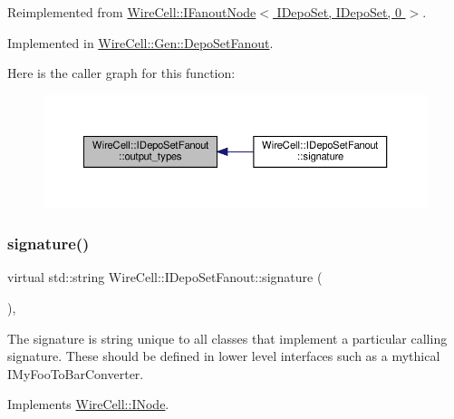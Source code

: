 Reimplemented from \hyperlink{class_wire_cell_1_1_i_fanout_node_a2191dc9d44b35d6ff4bda5d5356c6ac5}{Wire\+Cell\+::\+I\+Fanout\+Node$<$ I\+Depo\+Set, I\+Depo\+Set, 0 $>$}.



Implemented in \hyperlink{class_wire_cell_1_1_gen_1_1_depo_set_fanout_a11637470dcf8dc0ea0cbf6691a6984c0}{Wire\+Cell\+::\+Gen\+::\+Depo\+Set\+Fanout}.

Here is the caller graph for this function\+:
\nopagebreak
\begin{figure}[H]
\begin{center}
\leavevmode
\includegraphics[width=350pt]{class_wire_cell_1_1_i_depo_set_fanout_a90833e933801d4152272189dc6ba1e38_icgraph}
\end{center}
\end{figure}
\mbox{\label{class_wire_cell_1_1_i_depo_set_fanout_a7cf17fc3925de7224c8c8472e09f689e}} 
\subsubsection{\texorpdfstring{signature()}{signature()}}
{\footnotesize\ttfamily virtual std\+::string Wire\+Cell\+::\+I\+Depo\+Set\+Fanout\+::signature (\begin{DoxyParamCaption}{ }\end{DoxyParamCaption})\hspace{0.3cm}{\ttfamily [inline]}, {\ttfamily [virtual]}}

The signature is string unique to all classes that implement a particular calling signature. These should be defined in lower level interfaces such as a mythical I\+My\+Foo\+To\+Bar\+Converter. 

Implements \hyperlink{class_wire_cell_1_1_i_node_a0b0763465adf5ba7febe8e378162b584}{Wire\+Cell\+::\+I\+Node}.



